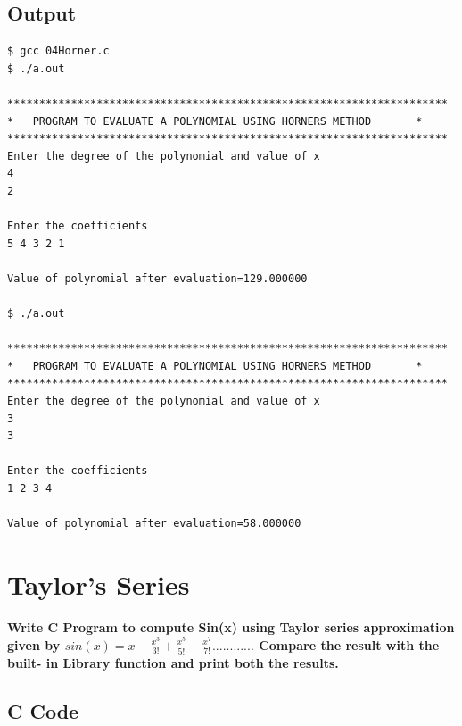 \documentclass[a4paper]{report}
\begin{document}
\section*{Output}
\begin{Verbatim}
$ gcc 04Horner.c 
$ ./a.out 

*********************************************************************
*	PROGRAM TO EVALUATE A POLYNOMIAL USING HORNERS METHOD	    *
*********************************************************************
Enter the degree of the polynomial and value of x
4
2

Enter the coefficients 
5 4 3 2 1

Value of polynomial after evaluation=129.000000

$ ./a.out 

*********************************************************************
*	PROGRAM TO EVALUATE A POLYNOMIAL USING HORNERS METHOD	    *
*********************************************************************
Enter the degree of the polynomial and value of x
3
3

Enter the coefficients 
1 2 3 4

Value of polynomial after evaluation=58.000000

\end{Verbatim}

\chapter{Taylor's Series}
{\selectfont \textbf{Write C Program to compute Sin(x) using Taylor series approximation given by
\(sin(x) = x - \frac{x^{3}}{3!} + \frac{x^{5}}{5!} - \frac{x^{7}}{7!}............\) Compare the result with the built- in Library function and print both the results.
}}

\section*{C Code}
\end{document}
